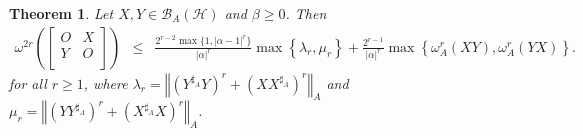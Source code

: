 \documentclass{article}
\newcommand{\bra}[1]{\left(#1\right)}
\newcommand{\normA}[1]{{\left\Vert#1\right\Vert}_{A}}
\newcommand{\abs}[1]{\left\vert#1\right\vert}
\newcommand{\set}[1]{\left\{#1\right\}}
\newcommand {\h}{\mathcal{H}}
\newcommand {\Xa}{X^{\sharp_{A}}}
\renewcommand {\b}{\mathcal{B}}
\newcommand {\Ya}{Y^{\sharp_{A}}}
\newtheorem{theorem}{Theorem}[section]
\begin{document}
 \begin{theorem} \label{Thm:alpha} Let $X,Y\in\b_A(\h)$ and $\beta\geq 0$. Then
\begin{eqnarray*}
  \omega^{2r}\bra{\begin{bmatrix} O& X\\ Y& O \\\end{bmatrix}}&\leq& \frac{2^{r-2}\max\{1,\abs{\alpha-1}^{r}\}}{\abs{\alpha}^{r}}\max\set{\lambda_r,\mu_r}+\frac{2^{r-1}}{\abs{\alpha}^{r}}\max\set{\omega_A^{r}(XY),\omega_A^{r}(YX)}.
\end{eqnarray*}
for all $r\geq 1$, where  $\lambda_r=\normA{\bra{\Ya Y}^r+\bra{X\Xa}^r}$ and  $\mu_r=\normA{\bra{Y\Ya }^r+\bra{\Xa X}^r}$.
 \end{theorem}
\end{document}
